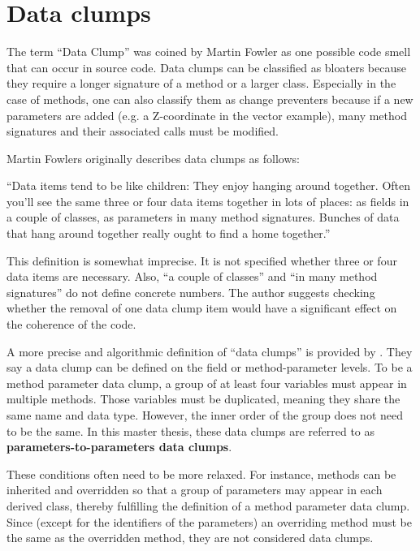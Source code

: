 \section{Data clumps}\label{sec:data_clump_def}
The term \enquote{Data Clump} was coined by Martin Fowler as one possible code smell that can occur in source code. 
Data clumps can be classified as bloaters because they require a longer signature of a method or a larger class. Especially in the case of methods, one can also classify them as change preventers because if a new parameters are added (e.g. a Z-coordinate in the vector example), many method signatures and their associated calls must be modified. 

Martin Fowlers originally describes data clumps as follows:

\begin{displayquote}
\enquote{Data items tend to be like children: They enjoy hanging around together. Often you'll see
the same three or four data items together in lots of
places: as fields in a couple of classes, as parameters in many
method signatures. Bunches of data that hang around together really ought to find a home together.} \cite{fowler2019refactoring} 
\end{displayquote}


This definition is somewhat imprecise. It is not specified whether three or four data items are necessary. Also, \enquote{a couple of classes} and \enquote{in many method signatures} do not define concrete numbers. The author suggests checking whether the removal of one data clump item would have a significant effect on the coherence of the code.

A more precise and algorithmic definition of \enquote{data clumps} is provided by \cite{zhangImprovingPrecisionFowler2008}. They say a data clump can be defined on the field or method-parameter levels. 
To be a method parameter data clump, a group of at least four variables must appear in multiple methods. Those variables must be duplicated, meaning they share the same name and data type. However, the inner order of the group does not need to be the same. In this master thesis, these data clumps are referred to as \textbf{parameters-to-parameters data clumps}.

These conditions often need to be more relaxed. For instance, methods can be inherited and overridden so that a group of parameters may appear in each derived class, thereby fulfilling the definition of a method parameter data clump. Since (except for the identifiers of the parameters) an overriding method must be the same as the overridden method, they are not considered data clumps.


